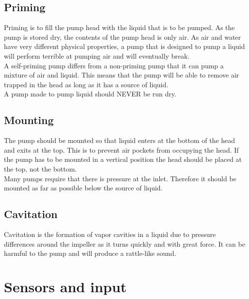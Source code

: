 \documentclass[11pt,fleqn]{book} %
\begin{document}
\section{Priming}

Priming is to fill the pump head with the liquid that is to be pumped. As the pump is stored dry, the contents of the pump head is only air. As air and water have very different physical properties, a pump that is designed to pump a liquid will perform terrible at pumping air and will eventually break.\\

A self-priming pump differs from a non-priming pump that it can pump a mixture of air and liquid. This means that the pump will be able to remove air trapped in the head as long as it has a source of liquid.\\

A pump made to pump liquid should NEVER be run dry.

\section{Mounting}

The pump should be mounted so that liquid enters at the bottom of the head and exits at the top. This is to prevent air pockets from occupying the head. If the pump has to be mounted in a vertical position the head should be placed at the top, not the bottom.\\

Many pumps require that there is pressure at the inlet. Therefore it should be mounted as far as possible below the source of liquid.

\section{Cavitation}

Cavitation is the formation of vapor cavities in a liquid due to pressure differences around the impeller as it turns quickly and with great force. It can be harmful to the pump and will produce a rattle-like sound.



\chapter{Sensors and input}
\end{document}

